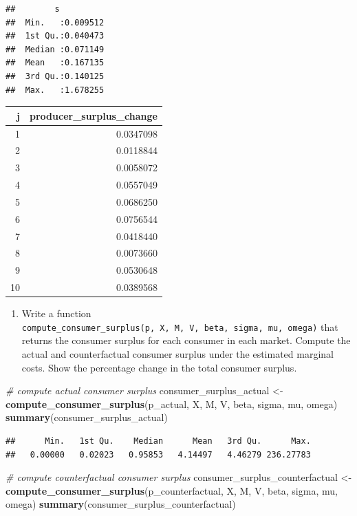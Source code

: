 \documentclass[]{book}
\newenvironment{Shaded}{\begin{snugshade}}{\end{snugshade}}
\newcommand{\KeywordTok}[1]{\textcolor[rgb]{0.13,0.29,0.53}{\textbf{#1}}}
\newcommand{\StringTok}[1]{\textcolor[rgb]{0.31,0.60,0.02}{#1}}
\newcommand{\CommentTok}[1]{\textcolor[rgb]{0.56,0.35,0.01}{\textit{#1}}}
\newcommand{\NormalTok}[1]{#1}
\providecommand{\tightlist}{%
  \setlength{\itemsep}{0pt}\setlength{\parskip}{0pt}}
\begin{document}
\begin{verbatim}
##        s           
##  Min.   :0.009512  
##  1st Qu.:0.040473  
##  Median :0.071149  
##  Mean   :0.167135  
##  3rd Qu.:0.140125  
##  Max.   :1.678255
\end{verbatim}

\begin{tabular}{r|r}
\hline
j & producer\_surplus\_change\\
\hline
1 & 0.0347098\\
\hline
2 & 0.0118844\\
\hline
3 & 0.0058072\\
\hline
4 & 0.0557049\\
\hline
5 & 0.0686250\\
\hline
6 & 0.0756544\\
\hline
7 & 0.0418440\\
\hline
8 & 0.0073660\\
\hline
9 & 0.0530648\\
\hline
10 & 0.0389568\\
\hline
\end{tabular}

\begin{enumerate}
\def\labelenumi{\arabic{enumi}.}
\setcounter{enumi}{3}
\tightlist
\item
  Write a function
  \texttt{compute\_consumer\_surplus(p,\ X,\ M,\ V,\ beta,\ sigma,\ mu,\ omega)}
  that returns the consumer surplus for each consumer in each market.
  Compute the actual and counterfactual consumer surplus under the
  estimated marginal costs. Show the percentage change in the total
  consumer surplus.
\end{enumerate}

\begin{Shaded}
\begin{Highlighting}[]
\CommentTok{# compute actual consumer surplus}
\NormalTok{consumer_surplus_actual <-}\StringTok{ }
\StringTok{  }\KeywordTok{compute_consumer_surplus}\NormalTok{(p_actual, X, M, V, beta, sigma, mu, omega)}
\KeywordTok{summary}\NormalTok{(consumer_surplus_actual)}
\end{Highlighting}
\end{Shaded}

\begin{verbatim}
##      Min.   1st Qu.    Median      Mean   3rd Qu.      Max. 
##   0.00000   0.02023   0.95853   4.14497   4.46279 236.27783
\end{verbatim}

\begin{Shaded}
\begin{Highlighting}[]
\CommentTok{# compute counterfactual consumer surplus}
\NormalTok{consumer_surplus_counterfactual <-}\StringTok{ }
\StringTok{  }\KeywordTok{compute_consumer_surplus}\NormalTok{(p_counterfactual, X, M, V, beta, sigma, mu, omega)}
\KeywordTok{summary}\NormalTok{(consumer_surplus_counterfactual)}
\end{Highlighting}
\end{Shaded}
\end{document}
